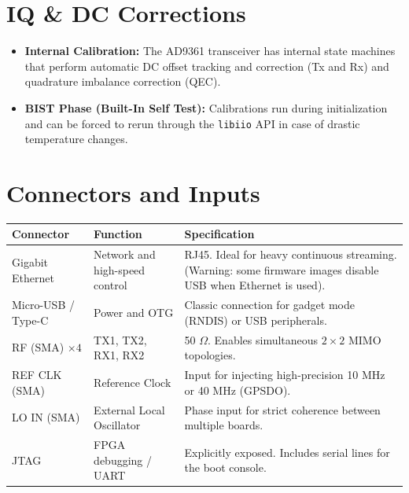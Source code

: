 \documentclass[11pt]{article}
\begin{document}
\section{IQ \& DC Corrections}

\begin{itemize}
    \item \textbf{Internal Calibration:} The AD9361 transceiver has internal state machines that perform automatic DC offset tracking and correction (Tx and Rx) and quadrature imbalance correction (QEC).
    \item \textbf{BIST Phase (Built-In Self Test):} Calibrations run during initialization and can be forced to rerun through the \texttt{libiio} API in case of drastic temperature changes.
\end{itemize}

\section{Connectors and Inputs}

\begin{table}[h]
    \centering
    \small
    \begin{tabular}{p{}p{}p{}}
        \toprule
        \textbf{Connector} & \textbf{Function} & \textbf{Specification} \\
        \midrule
        Gigabit Ethernet & Network and high-speed control & RJ45. Ideal for heavy continuous streaming. (Warning: some firmware images disable USB when Ethernet is used). \\
        Micro-USB / Type-C & Power and OTG & Classic connection for gadget mode (RNDIS) or USB peripherals. \\
        RF (SMA) $\times 4$ & TX1, TX2, RX1, RX2 & 50 $\Omega$. Enables simultaneous $2\times2$ MIMO topologies. \\
        REF CLK (SMA) & Reference Clock & Input for injecting high-precision 10 MHz or 40 MHz (GPSDO). \\
        LO IN (SMA) & External Local Oscillator & Phase input for strict coherence between multiple boards. \\
        JTAG & FPGA debugging / UART & Explicitly exposed. Includes serial lines for the boot console. \\
        \bottomrule
    \end{tabular}
\end{table}
\end{document}
